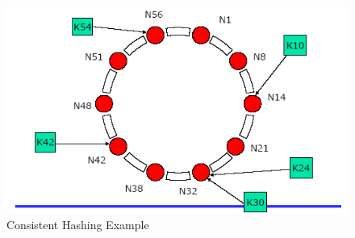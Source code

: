     \begin{figure}
	\caption{Consistent Hashing Example}
	\label{img:consistenHashing}
	\includegraphics[width=\textwidth]{Images/consistentHashing}
    \end{figure}


